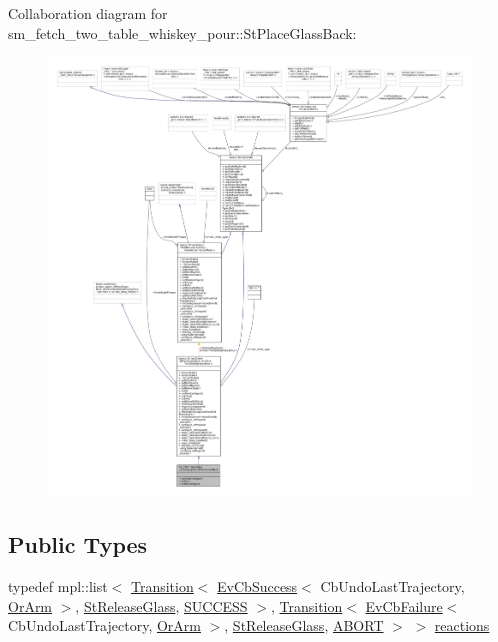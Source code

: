 Collaboration diagram for sm\+\_\+fetch\+\_\+two\+\_\+table\+\_\+whiskey\+\_\+pour\+:\+:St\+Place\+Glass\+Back\+:
\nopagebreak
\begin{figure}[H]
\begin{center}
\leavevmode
\includegraphics[width=350pt]{structsm__fetch__two__table__whiskey__pour_1_1StPlaceGlassBack__coll__graph}
\end{center}
\end{figure}
\subsection*{Public Types}
\begin{DoxyCompactItemize}
\item 
typedef mpl\+::list$<$ \hyperlink{classsmacc_1_1Transition}{Transition}$<$ \hyperlink{structsmacc_1_1EvCbSuccess}{Ev\+Cb\+Success}$<$ Cb\+Undo\+Last\+Trajectory, \hyperlink{classsm__fetch__two__table__whiskey__pour_1_1OrArm}{Or\+Arm} $>$, \hyperlink{structsm__fetch__two__table__whiskey__pour_1_1StReleaseGlass}{St\+Release\+Glass}, \hyperlink{structsmacc_1_1default__transition__tags_1_1SUCCESS}{S\+U\+C\+C\+E\+SS} $>$, \hyperlink{classsmacc_1_1Transition}{Transition}$<$ \hyperlink{structsmacc_1_1EvCbFailure}{Ev\+Cb\+Failure}$<$ Cb\+Undo\+Last\+Trajectory, \hyperlink{classsm__fetch__two__table__whiskey__pour_1_1OrArm}{Or\+Arm} $>$, \hyperlink{structsm__fetch__two__table__whiskey__pour_1_1StReleaseGlass}{St\+Release\+Glass}, \hyperlink{structsmacc_1_1default__transition__tags_1_1ABORT}{A\+B\+O\+RT} $>$ $>$ \hyperlink{structsm__fetch__two__table__whiskey__pour_1_1StPlaceGlassBack_a213af1569b47b18d2a7c531a2de73375}{reactions}
\end{DoxyCompactItemize}
